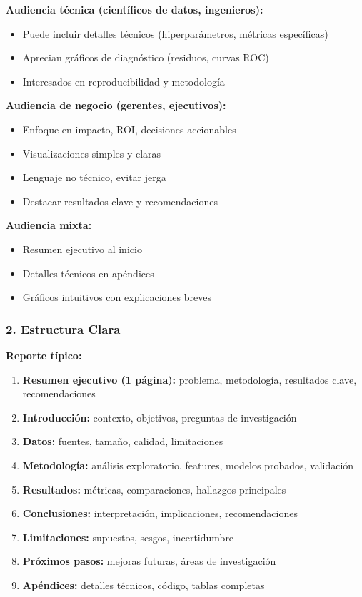 \documentclass[11pt,a4paper]{article}
\begin{document}
\textbf{Audiencia técnica (científicos de datos, ingenieros):}
\begin{itemize}
\item Puede incluir detalles técnicos (hiperparámetros, métricas específicas)
\item Aprecian gráficos de diagnóstico (residuos, curvas ROC)
\item Interesados en reproducibilidad y metodología
\end{itemize}

\textbf{Audiencia de negocio (gerentes, ejecutivos):}
\begin{itemize}
\item Enfoque en impacto, ROI, decisiones accionables
\item Visualizaciones simples y claras
\item Lenguaje no técnico, evitar jerga
\item Destacar resultados clave y recomendaciones
\end{itemize}

\textbf{Audiencia mixta:}
\begin{itemize}
\item Resumen ejecutivo al inicio
\item Detalles técnicos en apéndices
\item Gráficos intuitivos con explicaciones breves
\end{itemize}

\subsubsection{2. Estructura Clara}

\textbf{Reporte típico:}
\begin{enumerate}
\item \textbf{Resumen ejecutivo (1 página):} problema, metodología, resultados clave, recomendaciones
\item \textbf{Introducción:} contexto, objetivos, preguntas de investigación
\item \textbf{Datos:} fuentes, tamaño, calidad, limitaciones
\item \textbf{Metodología:} análisis exploratorio, features, modelos probados, validación
\item \textbf{Resultados:} métricas, comparaciones, hallazgos principales
\item \textbf{Conclusiones:} interpretación, implicaciones, recomendaciones
\item \textbf{Limitaciones:} supuestos, sesgos, incertidumbre
\item \textbf{Próximos pasos:} mejoras futuras, áreas de investigación
\item \textbf{Apéndices:} detalles técnicos, código, tablas completas
\end{enumerate}
\end{document}
